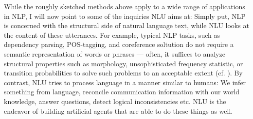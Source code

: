 While the roughly sketched methods above apply to a wide range of applications in NLP, I will now
point to some of the inquiries NLU aims at: Simply put, NLP is concerned with the structural side
of natural language text, while NLU looks at the content of these utterances. For example, typical
NLP tasks, such as dependency parsing, POS-tagging, and coreference soltution do not require a
semantic representation of words or phrases --- often, it suffices to analyze structural properties
such as morphology, unsophisticated frequency statistic, or transition probabilities to solve such
problems to an acceptable extent (cf. \cite{kumawat2015pos}). By contrast, NLU tries to process
language in a manner similar to humans: We infer something from language, reconcile communication
information with our world knowledge, answer questions, detect logical inconsistencies etc. NLU is
the endeavor of building artificial agents that are able to do these things as well.



